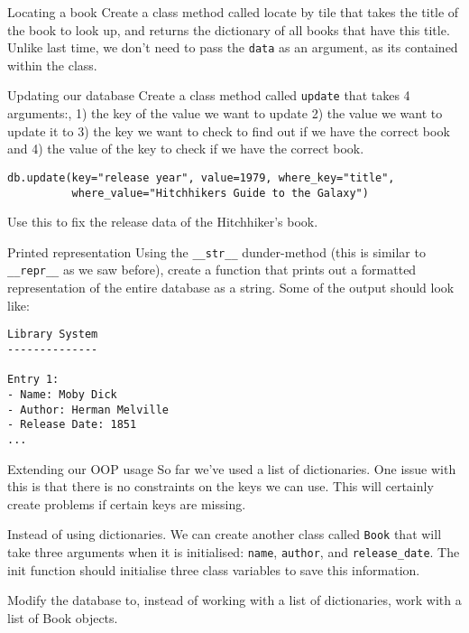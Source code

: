 \documentclass[10pt]{beamer}
\begin{document}
\begin{frame}[label={sec:org77fb967},fragile]{Locating a book}
 Create a class method called locate by tile that takes the title of the book to look
up, and returns the dictionary of all books that have this title. Unlike last time,
we don't need to pass the \texttt{data} as an argument, as its contained within the class.
\end{frame}

\begin{frame}[label={sec:org181149b},fragile]{Updating our database}
 Create a class method called \texttt{update} that takes 4 arguments:, 1) the key of the value
we want to update 2) the value we want to update it to 3) the key we want to check
to find out if we have the correct book and 4) the value of the key to check if we
have the correct book.

\begin{verbatim}
db.update(key="release year", value=1979, where_key="title",
          where_value="Hitchhikers Guide to the Galaxy")
\end{verbatim}

Use this to fix the release data of the Hitchhiker's book.
\end{frame}

\begin{frame}[label={sec:org741e82a},fragile]{Printed representation}
 Using the \texttt{\_\_str\_\_} dunder-method (this is similar to \texttt{\_\_repr\_\_} as we saw before),
create a function that prints out a formatted representation of the entire database
as a string. Some of the output should look like:

\begin{verbatim}
Library System
--------------

Entry 1:
- Name: Moby Dick
- Author: Herman Melville
- Release Date: 1851
...
\end{verbatim}
\end{frame}

\begin{frame}[label={sec:org721f50d},fragile]{Extending our OOP usage}
 So far we've used a list of dictionaries. One issue with this is that there is no
constraints on the keys we can use. This will certainly create problems if certain
keys are missing.

Instead of using dictionaries. We can create another class called \texttt{Book} that will take
three arguments when it is initialised: \texttt{name}, \texttt{author}, and \texttt{release\_date}. The init
function should initialise three class variables to save this information.

Modify the database to, instead of working with a list of dictionaries, work with a
list of Book objects.
\end{frame}
\end{document}
